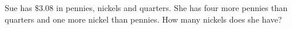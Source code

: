 Sue has $\$3.08$ in pennies, nickels and quarters. She has four more pennies than quarters and one more nickel than pennies. How many nickels does she have?
